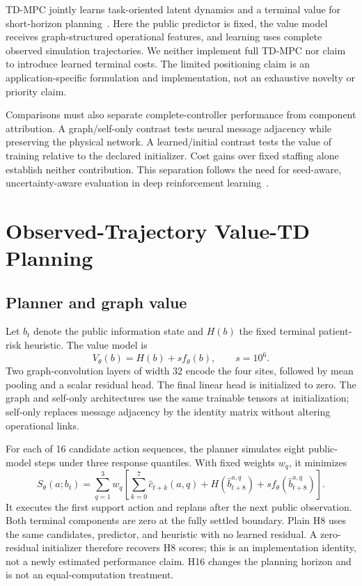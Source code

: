 \documentclass[preprint,review,12pt]{elsarticle}
\begin{document}
TD-MPC jointly learns task-oriented latent dynamics and a terminal value
for short-horizon planning~\cite{Hansen2022TDMPC}. Here the public predictor
is fixed, the value model receives graph-structured operational features,
and learning uses complete observed simulation trajectories. We neither
implement full TD-MPC nor claim to introduce learned terminal costs.
The limited positioning claim is an application-specific formulation and
implementation, not an exhaustive novelty or priority claim.

Comparisons must also separate complete-controller performance from component
attribution. A graph/self-only contrast tests neural message adjacency while
preserving the physical network. A learned/initial contrast tests the value
of training relative to the declared initializer. Cost gains over fixed
staffing alone establish neither contribution. This separation follows the
need for seed-aware, uncertainty-aware evaluation in deep reinforcement
learning~\cite{Henderson2018DRLMatters,Agarwal2021RLiable}.

\section{Observed-Trajectory Value-TD Planning}
\label{sec:method}
\subsection{Planner and graph value}
Let $b_t$ denote the public information state and $H(b)$ the fixed terminal
patient-risk heuristic. The value model is
\begin{equation}
V_\theta(b)=H(b)+s f_\theta(b), \qquad s=10^6.
\label{eq:residual-value}
\end{equation}
Two graph-convolution layers of width 32 encode the four sites, followed by
mean pooling and a scalar residual head. The final linear head is initialized
to zero. The graph and self-only architectures use the same trainable tensors
at initialization; self-only replaces message adjacency by the identity
matrix without altering operational links.

For each of 16 candidate action sequences, the planner simulates eight
public-model steps under three response quantiles. With fixed weights $w_q$,
it minimizes
\begin{equation}
S_\theta(a;b_t)=
\sum_{q=1}^{3}w_q\left[
\sum_{k=0}^{7}\widehat c_{t+k}(a,q)
+H(\widehat b_{t+8}^{a,q})
+s f_\theta(\widehat b_{t+8}^{a,q})
\right].
\label{eq:current-value-mpc-score}
\end{equation}
It executes the first support action and replans after the next public
observation. Both terminal components are zero at the fully settled boundary.
Plain H8 uses the same candidates, predictor, and heuristic with no learned
residual. A zero-residual initializer therefore recovers H8 scores;
this is an implementation identity, not a newly estimated performance claim.
H16 changes the planning horizon and is not an equal-computation treatment.
\end{document}
